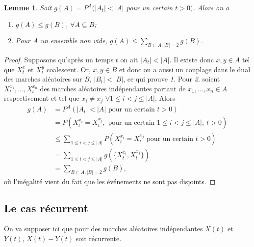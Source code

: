 \documentclass[a4paper,11pt]{article}
\theoremstyle{break}
\theoremstyle{break}
\newtheorem{lemma}[theorem]{Lemme}
\theoremstyle{definition}
\theoremstyle{remark}
\begin{document}
\begin{lemma}\label{sousensemble}
Soit $g(A)=P^A(\vert A_t\vert < \vert A \vert$ pour un certain $t > 0)$. Alors on a
\begin{enumerate}
\item $g(A)\leq g(B)$, $\forall A\subseteq B$;
\item Pour $A$ un ensemble non vide, $g(A)\leq \sum\limits_{B\subset A,\vert B\vert=2} g(B)$.
\end{enumerate}
\end{lemma}
\begin{proof}
Supposons qu'après un temps $t$ on ait $\vert A_t\vert < \vert A \vert$. Il existe donc $x,y\in A$ tel que $X^x_t$ et $X^y_t$ coalescent. Or, $x,y\in B$ et donc on a aussi un couplage dans le dual des marches aléatoires sur $B$, $\vert B_t\vert < \vert B \vert$, ce qui prouve \textit{1.}
Pour \textit{2.} soient $X^{x_1}_t,...,X^{x_n}_t$ des marches aléatoires indépendantes partant de $x_1,...,x_n\in A$ respectivement et tel que $x_i\neq x_j$ $\forall 1\leq i<j\leq \vert A\vert$. Alors
\begin{align*}
g(A)&=P^A(\vert A_t\vert < \vert A \vert\text{ pour un certain }t > 0)\\
&=P(X^{x_i}_t=X^{x_j}_t,  \text{ pour un certain } 1\leq i<j\leq \vert A\vert,\ t > 0)\\
&\leq \sum\limits_{1\leq i<j\leq \vert A\vert} P(X^{x_i}_t=X^{x_j}_t \text{ pour un certain }t > 0)\\
&=\sum\limits_{1\leq i<j\leq \vert A\vert}g(\{ X^{x_i}_t,X^{x_j}_t\})\\
&=\sum\limits_{B\subset A,\vert B\vert=2} g(B),
\end{align*}
où l'inégalité vient du fait que les événements ne sont pas disjoints.
\end{proof}
\subsection{Le cas récurrent}
On va supposer ici que pour des marches aléatoires indépendantes $X(t)$ et $Y(t)$, $X(t)-Y(t)$ soit récurrente.
\end{document}
